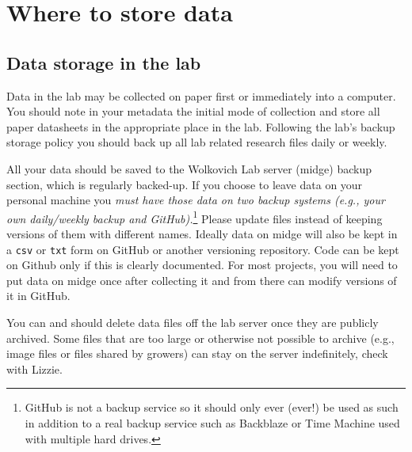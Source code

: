 \documentclass[11pt,a4paper,oneside]{article}
\begin{document}
\section{Where to store data}
\subsection{Data storage in the lab}
\label{labstorage}
Data in the lab may be collected on paper first or immediately into a computer. You should note in your metadata the initial mode of collection and store all paper datasheets in the appropriate place in the lab. Following the lab's backup storage policy you should back up all lab related research files daily or weekly. 

All your data should be saved to the Wolkovich Lab server (midge) backup section, which is regularly backed-up. If you choose to leave data on your personal machine you \emph{must have those data on two backup systems (e.g., your own daily/weekly backup and GitHub).}\footnote{GitHub is not a backup service so it should only ever (ever!) be used as such in addition to a real backup service such as Backblaze or Time Machine used with multiple hard drives.} Please update files instead of keeping versions of them with different names. Ideally data on midge will also be kept in a \verb|csv| or \verb|txt| form on GitHub or another versioning repository. Code can be kept on Github only if this is clearly documented. For most projects, you will need to put data on midge once after collecting it and from there can modify versions of it in GitHub. 

You can and should delete data files off the lab server once they are publicly archived. Some files that are too large or otherwise not possible to archive (e.g., image files or files shared by growers) can stay on the server indefinitely, check with Lizzie. 

\end{document}
